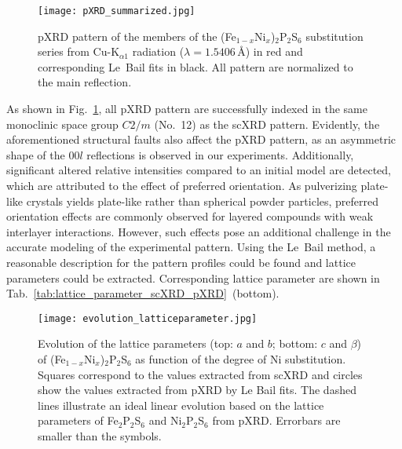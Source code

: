 \documentclass[twocolumn,superscriptaddress,prb,preprintnumbers,nobibnotes,aps]{revtex4-2}  %
\begin{document}
\begin{figure}[tb]
\texttt{[image: pXRD\_summarized.jpg]}
\caption{
pXRD pattern of the members of the (Fe$_{1-x}$Ni$_x$)$_2$P$_2$S$_6$ substitution series from Cu-K$_{\alpha1}$ radiation ($\lambda = 1.5406$\,\r{A}) in red and corresponding Le~Bail fits in black. All pattern are normalized to the main reflection.
}
\label{fig:pXRD_summarized}
\end{figure}

As shown in Fig.~\ref{fig:pXRD_summarized}, all pXRD pattern are successfully indexed in the same monoclinic space group $C2/m$ (No.~12) as the scXRD pattern. Evidently, the aforementioned structural faults also affect the pXRD pattern, as an asymmetric shape of the $00l$ reflections is observed in our experiments. Additionally, significant altered relative intensities compared to an initial model are detected, which are attributed to the effect of preferred orientation. As pulverizing plate-like crystals yields plate-like rather than spherical powder particles, preferred orientation effects are commonly observed for layered compounds with weak interlayer interactions. However, such effects pose an additional challenge in the accurate modeling of the experimental pattern. Using the Le~Bail method, a reasonable description for the pattern profiles could be found and lattice parameters could be extracted. Corresponding lattice parameter are shown in Tab.~\ref{tab:lattice_parameter_scXRD_pXRD}~(bottom).

\begin{figure}[tb]
\texttt{[image: evolution\_latticeparameter.jpg]}
\caption{
Evolution of the lattice parameters (top: $a$ and $b$; bottom: $c$ and $\beta$) of (Fe$_{1-x}$Ni$_x$)$_2$P$_2$S$_6$ as function of the degree of Ni substitution. Squares correspond to the values extracted from scXRD and circles show the values extracted from pXRD by Le Bail fits. The dashed lines illustrate an ideal linear evolution based on the lattice parameters of Fe$_2$P$_2$S$_6$ and Ni$_2$P$_2$S$_6$ from pXRD. Errorbars are smaller than the symbols.
}
\label{fig:evolution_lattice_parameter_cell_volume}
\end{figure}
\end{document}
